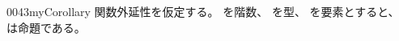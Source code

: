 \documentclass[index]{subfiles}
\begin{document}
\begin{myBlock}{0043}{myCorollary}
  関数外延性を仮定する。
  を階数、
  を型、
  を要素とすると、
  は命題である。\myQed
\end{myBlock}
\end{document}
